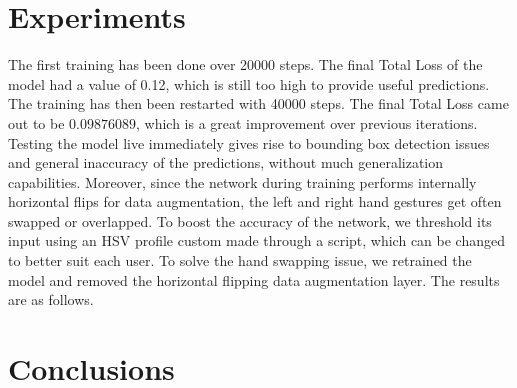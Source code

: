 \documentclass[a4paper, 12pt]{article}
\begin{document}
\section{Experiments}
\begin{flushleft}
The first training has been done over 20000 steps. The final Total Loss of the model had a value of 0.12, which is still too high to provide useful predictions.
The training has then been restarted with 40000 steps. The final Total Loss came out to be $0.09876089$, which is a great improvement over previous iterations. Testing the model live immediately gives rise to bounding box detection issues and general inaccuracy of the predictions, without much generalization capabilities. Moreover, since the network during training performs internally horizontal flips for data augmentation, the left and right hand gestures get often swapped or overlapped.\linebreak
To boost the accuracy of the network, we threshold its input using an HSV profile custom made through a script, which can be changed to better suit each user.
To solve the hand swapping issue, we retrained the model and removed the horizontal flipping data augmentation layer.\linebreak
The results are as follows.

\end{flushleft}

\section{Conclusions}
\begin{flushleft}

\end{flushleft}

\onecolumn
\end{document}
